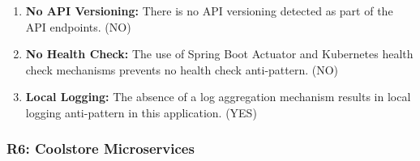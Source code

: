 \documentclass{Configuration_Files/PoliMi3i_thesis}
\begin{document}
\begin{enumerate}
    \item \textbf{No API Versioning:} There is no API versioning detected as part of the API endpoints. (NO)
    
    \item \textbf{No Health Check:} The use of Spring Boot Actuator and Kubernetes health check mechanisms prevents no health check anti-pattern. (NO)
    
    \item \textbf{Local Logging:} The absence of a log aggregation mechanism results in local logging anti-pattern in this application. (YES)
\end{enumerate}

\subsubsection{R6: Coolstore Microservices}
\label{subsubsec:R6}
\end{document}
